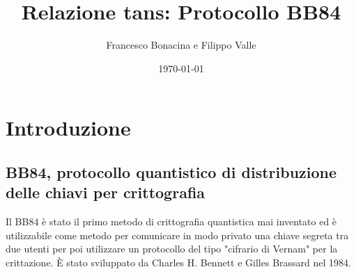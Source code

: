 \documentclass[11 pt, a4paper]{article}
\author{Francesco Bonacina e Filippo Valle}
\date{\today}
\title{Relazione tans: Protocollo BB84}
\begin{document}
\maketitle

\thispagestyle{empty}
\tableofcontents

\clearpage
\section{Introduzione}
\subsection{BB84, protocollo quantistico di distribuzione delle chiavi per crittografia}
Il BB84 è stato il primo metodo di crittografia quantistica mai inventato ed è utilizzabile come metodo per comunicare in modo privato una chiave segreta tra due utenti per poi utilizzare un protocollo del tipo "cifrario di Vernam" per la crittazione. È stato sviluppato da Charles H. Bennett e Gilles Brassard nel 1984.
\end{document}
